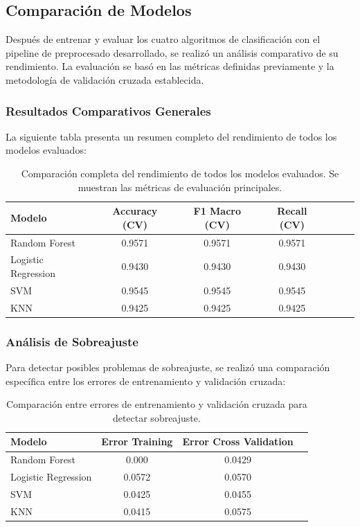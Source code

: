 \documentclass{article}
\begin{document}
\subsection{Comparación de Modelos}

Después de entrenar y evaluar los cuatro algoritmos de clasificación con el pipeline de preprocesado desarrollado, se realizó un análisis comparativo de su rendimiento. La evaluación se basó en las métricas definidas previamente y la metodología de validación cruzada establecida.

\subsubsection{Resultados Comparativos Generales}

La siguiente tabla presenta un resumen completo del rendimiento de todos los modelos evaluados:

\begin{table}[H]
\centering
\begin{tabular}{|l|c|c|c|c|c|c|}
\hline
\textbf{Modelo} &  \textbf{Accuracy (CV)} & \textbf{F1 Macro (CV)} & \textbf{Recall (CV)} \\
\hline
Random Forest  & 0.9571 & 0.9571 & 0.9571 \\
\hline
Logistic Regression  & 0.9430 & 0.9430 & 0.9430 \\
\hline
SVM  & 0.9545 & 0.9545 & 0.9545 \\
\hline
KNN  & 0.9425 & 0.9425 & 0.9425 \\
\hline
\end{tabular}
\caption{Comparación completa del rendimiento de todos los modelos evaluados. Se muestran las métricas de evaluación principales.}
\label{tab:comparacion_completa}
\end{table}

\subsubsection{Análisis de Sobreajuste}

Para detectar posibles problemas de sobreajuste, se realizó una comparación específica entre los errores de entrenamiento y validación cruzada:

\begin{table}[H]
\centering
\begin{tabular}{|l|c|c|c|}
\hline
\textbf{Modelo} & \textbf{Error Training} & \textbf{Error Cross Validation} \\
\hline
Random Forest & 0.000 & 0.0429 \\
\hline
Logistic Regression & 0.0572 & 0.0570  \\
\hline
SVM & 0.0425 & 0.0455 \\
\hline
KNN & 0.0415 & 0.0575  \\
\hline
\end{tabular}
\caption{Comparación entre errores de entrenamiento y validación cruzada para detectar sobreajuste.}
\label{tab:analisis_overfitting}
\end{table}
\end{document}
